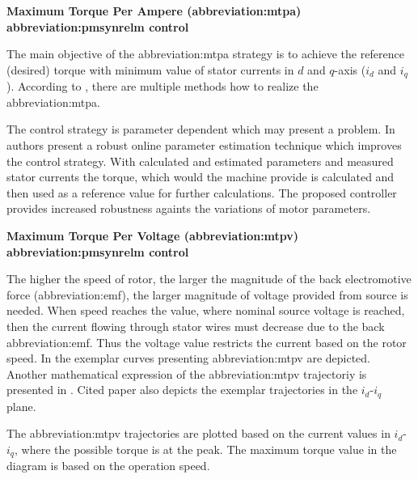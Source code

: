 \documentclass[a4paper, twoside, 11pt]{article}
\begin{document}
            \vspace*{1.5cm}
             \hspace*{-\parindent} \textbf{Maximum Torque Per Ampere (\gls{abbreviation:mtpa}) \gls{abbreviation:pmsynrelm} control}\par
                \hspace*{\parindent} The main objective of the \gls{abbreviation:mtpa} strategy is to achieve the reference (desired) torque with minimum value of stator currents in $d$ and $q$-axis ($i_d$ and $i_q$). According to \cite{dwivedi-review-on-control-strategies-of-permanent-magnet-assisted-synchronous-reluctance-motor-drive}, there are multiple methods how to realize the \gls{abbreviation:mtpa}.\par
                The control strategy is parameter dependent which may present a problem. In \cite{niazi-robust-maximum-torque-per-ampere-control-of-pmsynrelm} authors present a robust online parameter estimation technique which improves the control strategy. With calculated and estimated parameters and measured stator currents the torque, which would the machine provide is calculated and then used as a reference value for further calculations. The proposed controller provides increased robustness againts the variations of motor parameters.

            \vspace*{1.5cm}
             \hspace*{-\parindent} \textbf{Maximum Torque Per Voltage (\gls{abbreviation:mtpv}) \gls{abbreviation:pmsynrelm} control}\par
                \hspace*{\parindent} The higher the speed of rotor, the larger the magnitude of the back electromotive force (\gls{abbreviation:emf}), the larger magnitude of voltage provided from source is needed. When speed reaches the value, where nominal source voltage is reached, then the current flowing through stator wires must decrease due to the back \gls{abbreviation:emf}. Thus the voltage value restricts the current based on the rotor speed. In \cite{sanz-analitical-maximum-torque-per-volt-control-strategu-of-an-interior-permanent-magnet-synchronous-motor-with-very-low-battery-voltage} the exemplar curves presenting \gls{abbreviation:mtpv} are depicted. Another mathematical expression of the \gls{abbreviation:mtpv} trajectoriy is presented in \cite{fletcher-operation-along-the-maximum-torque-per-voltage-trajectory-in-a-direct-torque-and-flux-controlled-interior-permament-magnet-synchronous-motor}. Cited paper also depicts the exemplar trajectories in the $i_d$-$i_q$ plane.
                \par
                The \gls{abbreviation:mtpv} trajectories are plotted based on the current values in $i_d$-$i_q$, where the possible torque is at the peak. The maximum torque value in the diagram is based on the operation speed.
\end{document}
